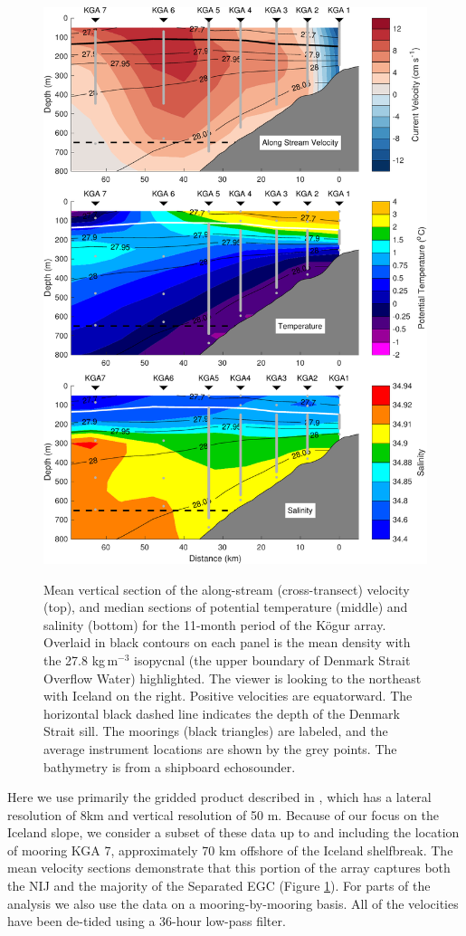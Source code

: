 \documentclass[12pt,titlepage,figuresatend]{article}
\begin{document}
\begin{figure}[p!]
  \centering\includegraphics[width=.9\hsize]{./figures/plot_section.pdf}
  \caption{Mean vertical section of the along-stream (cross-transect) velocity (top), and median sections of potential temperature (middle) and salinity (bottom) for the 11-month period of the K\"{o}gur array. Overlaid in black contours on each panel is the mean density with the 27.8 kg$\,$m$^{-3}$ isopycnal (the upper boundary of Denmark Strait Overflow Water) highlighted. The viewer is looking to the northeast with Iceland on the right. Positive velocities are equatorward. The horizontal black dashed line indicates the depth of the Denmark Strait sill. The moorings (black triangles) are labeled, and the 
  average instrument locations are shown by the grey points. The bathymetry is from a shipboard echosounder.}{\label{fig_section}}
\end{figure}

Here we use primarily the gridded product described in \cite{Harden2016}, which has a lateral resolution of 8km and vertical resolution of 50 m. Because of our focus on the Iceland slope, we consider a subset of these data up to and including the location of mooring KGA 7, approximately 70 km offshore of the Iceland shelfbreak. The mean velocity sections demonstrate that this portion of the array captures both the NIJ and the majority of the Separated EGC (Figure \ref{fig_section}). For parts of the analysis we also use the data on a mooring-by-mooring basis. All of the velocities have been de-tided using a 36-hour low-pass filter.
\end{document}
